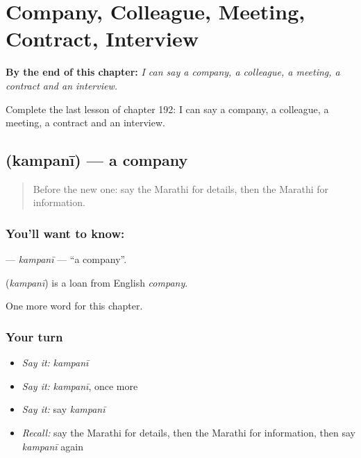 
\chapter{Company, Colleague, Meeting, Contract, Interview}
\label{ch:mr-company-colleague-meeting-contract-interview}

\begin{chapteropening}
\textbf{By the end of this chapter:} \emph{I can say a company, a colleague, a meeting, a contract and an interview.}

Complete the last lesson of chapter 192: I can say a company, a colleague, a meeting, a contract and an interview.
\end{chapteropening}

\section[\texorpdfstring{\mr{कंपनी} (kampanī)}{कंपनी (kampanī)}]{ (kampanī) — a company}

\label{lesson:MR-C192-kampani}



\begin{quote}
Before the new one: say the Marathi for details, then the Marathi for information.
\end{quote}

\subsection*{You'll want to know: }
\textbf{} — \emph{kampanī} — \textquotedblleft{}a company\textquotedblright{}.

\begin{cousinweb}
\textbf{} (\emph{kampanī}) is a loan from English \emph{company}.
\end{cousinweb}

\begin{grammarlens}[title={What you've built}]
One more word for this chapter.
\end{grammarlens}

\subsection*{Your turn}
\begin{itemize}
\raggedright
  \item \emph{Say it:} \emph{kampanī}
  \item \emph{Say it:} \emph{kampanī}, once more
  \item \emph{Say it:} say \emph{kampanī}
  \item \emph{Recall:} say the Marathi for details, then the Marathi for information, then say \emph{kampanī} again
\end{itemize}

